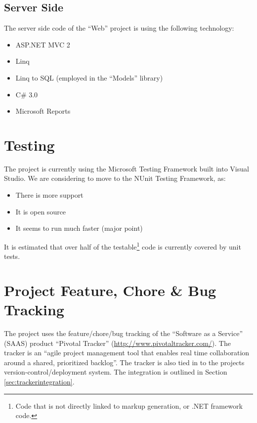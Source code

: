 \documentclass{article}
\begin{document}
\subsection{Server Side}
The server side code of the ``Web'' project is using the following technology:
\begin{itemize}
  \item ASP.NET MVC 2
  \item Linq
  \item Linq to SQL (employed in the ``Models'' library)
  \item C\# 3.0
  \item Microsoft Reports
\end{itemize}

\section{Testing}
The project is currently using the Microsoft Testing Framework built into Visual Studio. We are considering to move to the NUnit Testing Framework, as:
\begin{itemize}
  \item There is more support
  \item It is open source
  \item It seems to run much faster (major point)
\end{itemize}
It is estimated that over half of the testable\footnote{Code that is not directly linked to markup generation, or .NET framework code.} code is currently covered by unit tests.

\section{Project Feature, Chore \& Bug Tracking}
The project uses the feature/chore/bug tracking of the ``Software as a Service'' (SAAS) product ``Pivotal Tracker'' (\url{http://www.pivotaltracker.com/}). The tracker is an ``agile project management tool that enables real time collaboration around a shared, prioritized backlog''. The tracker is also tied in to the projects version-control/deployment system. The integration is outlined in Section \ref{sec:trackerintegration}.
\end{document}
